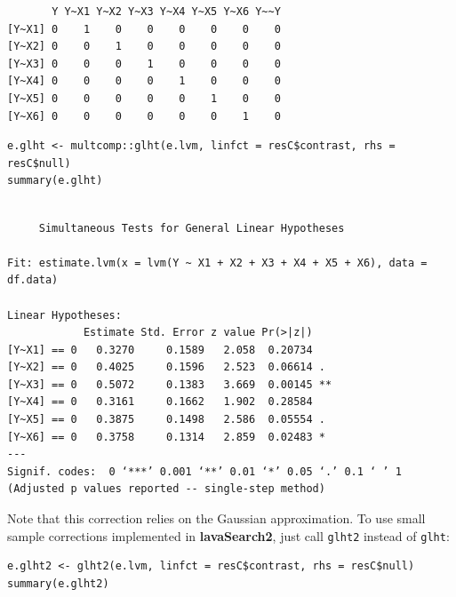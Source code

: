 \documentclass[12pt]{article}
\begin{document}
\begin{verbatim}
       Y Y~X1 Y~X2 Y~X3 Y~X4 Y~X5 Y~X6 Y~~Y
[Y~X1] 0    1    0    0    0    0    0    0
[Y~X2] 0    0    1    0    0    0    0    0
[Y~X3] 0    0    0    1    0    0    0    0
[Y~X4] 0    0    0    0    1    0    0    0
[Y~X5] 0    0    0    0    0    1    0    0
[Y~X6] 0    0    0    0    0    0    1    0
\end{verbatim}


\lstset{language=r,label= ,caption= ,captionpos=b,numbers=none}
\begin{lstlisting}
e.glht <- multcomp::glht(e.lvm, linfct = resC$contrast, rhs = resC$null)
summary(e.glht)
\end{lstlisting}

\begin{verbatim}

	 Simultaneous Tests for General Linear Hypotheses

Fit: estimate.lvm(x = lvm(Y ~ X1 + X2 + X3 + X4 + X5 + X6), data = df.data)

Linear Hypotheses:
            Estimate Std. Error z value Pr(>|z|)   
[Y~X1] == 0   0.3270     0.1589   2.058  0.20734   
[Y~X2] == 0   0.4025     0.1596   2.523  0.06614 . 
[Y~X3] == 0   0.5072     0.1383   3.669  0.00145 **
[Y~X4] == 0   0.3161     0.1662   1.902  0.28584   
[Y~X5] == 0   0.3875     0.1498   2.586  0.05554 . 
[Y~X6] == 0   0.3758     0.1314   2.859  0.02483 * 
---
Signif. codes:  0 ‘***’ 0.001 ‘**’ 0.01 ‘*’ 0.05 ‘.’ 0.1 ‘ ’ 1
(Adjusted p values reported -- single-step method)
\end{verbatim}

Note that this correction relies on the Gaussian approximation. To use
small sample corrections implemented in \textbf{lavaSearch2}, just call
\texttt{glht2} instead of \texttt{glht}:
\lstset{language=r,label= ,caption= ,captionpos=b,numbers=none}
\begin{lstlisting}
e.glht2 <- glht2(e.lvm, linfct = resC$contrast, rhs = resC$null)
summary(e.glht2)
\end{lstlisting}
\end{document}
